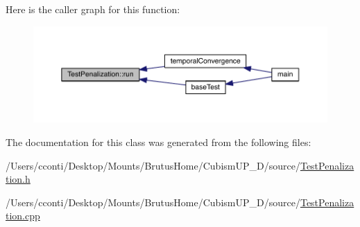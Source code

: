 Here is the caller graph for this function\+:
\nopagebreak
\begin{figure}[H]
\begin{center}
\leavevmode
\includegraphics[width=350pt]{d0/d08/class_test_penalization_a07dd4934e33caef13325d9599273ecee_icgraph}
\end{center}
\end{figure}




The documentation for this class was generated from the following files\+:\begin{DoxyCompactItemize}
\item 
/\+Users/cconti/\+Desktop/\+Mounts/\+Brutus\+Home/\+Cubism\+U\+P\+\_\+D/source/\hyperlink{_test_penalization_8h}{Test\+Penalization.\+h}\item 
/\+Users/cconti/\+Desktop/\+Mounts/\+Brutus\+Home/\+Cubism\+U\+P\+\_\+D/source/\hyperlink{_test_penalization_8cpp}{Test\+Penalization.\+cpp}\end{DoxyCompactItemize}
